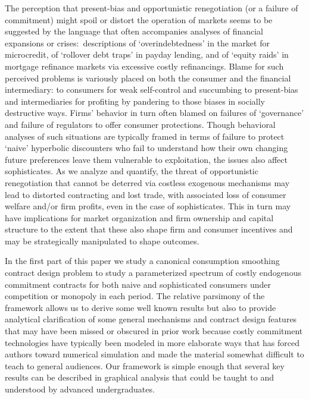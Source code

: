 \documentclass[11pt,english]{article}
\theoremstyle{plain}
\theoremstyle{definition}
\begin{document}
The perception that  present-bias and opportunistic renegotiation (or a failure of commitment) might  spoil or distort the operation of markets seems to be suggested by the language that often accompanies analyses of financial expansions or crises:\ descriptions of `overindebtedness' in the market for microcredit, of `rollover debt traps' in payday lending, and of `equity raids' in mortgage refinance markets via excessive costly refinancings. Blame for such perceived problems is variously placed on both the consumer and  the financial intermediary: to consumers for weak self-control and succumbing to present-bias
and intermediaries for profiting by pandering to those biases in socially destructive ways. Firms' behavior in turn often blamed on failures of `governance' and  failure of regulators to offer consumer protections. Though behavioral analyses of such situations are typically framed in terms of failure to protect `naive' hyperbolic discounters   who fail to understand how their own changing future preferences  leave them vulnerable to  exploitation, the issues also affect sophisticates. As we analyze and quantify, the threat of opportunistic renegotiation  that cannot be deterred via costless exogenous mechanisms may lead to distorted contracting and lost trade, with associated loss of consumer welfare and/or firm profits, even in the case of sophisticates. This in turn may have  implications for market organization and firm ownership and capital structure to the extent that these also shape firm and consumer incentives and may be strategically manipulated to shape outcomes.      

  

  

In the first part of this paper we study a canonical consumption smoothing contract design problem to study a parameterized spectrum of costly endogenous commitment contracts for both naive and sophisticated consumers under competition or monopoly in each period.
The relative parsimony of the framework allows us to derive some well known results but also to provide analytical clarification of some general mechanisms and contract design features that may have  been missed or obscured in prior work
because costly commitment technologies   have typically been modeled in more elaborate ways that has forced authors toward numerical simulation and made the material somewhat difficult to teach to general audiences. Our framework  is simple enough that several key results can be described in graphical analysis that could be taught to and understood by advanced undergraduates.
\end{document}
